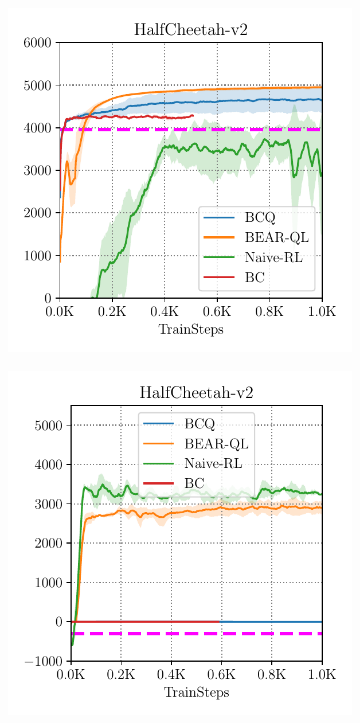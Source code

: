 \documentclass{article}
\begin{document}
\begin{figure}
\begin{subfigure}[t]{0.23\textwidth}
        \includegraphics[width=0.99\linewidth]{images/cheetah_mediocre.pdf}
    \end{subfigure}
    \begin{subfigure}[t]{0.23\textwidth}
        \centering
        \includegraphics[width=0.99\linewidth]{images/cheetah_random_final.pdf}

\end{subfigure}
\end{figure}
\end{document}
